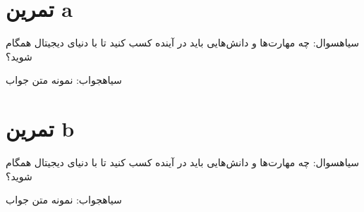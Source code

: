 \def \course {تحول دیجیتال}
\def \titlename {سری اول تمرین‌ها}
\def \name {ابراهیم نجاتی}
\def \studentnumber{۴۳۰۰۰۰۰}





\tableofcontents


\section{تمرین a}
‌سیاه{سوال:}
چه مهارت‌ها و دانش‌هایی باید در آینده کسب کنید تا با دنیای دیجیتال همگام شوید؟

‌سیاه{جواب:}
نمونه متن جواب


\section{تمرین b}
‌سیاه{سوال:}
چه مهارت‌ها و دانش‌هایی باید در آینده کسب کنید تا با دنیای دیجیتال همگام شوید؟

‌سیاه{جواب:}
نمونه متن جواب





